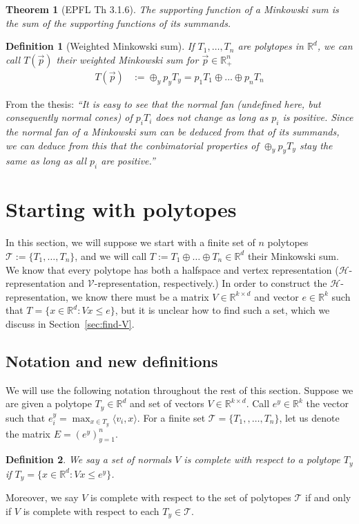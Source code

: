 \documentclass[12pt]{article}
\newcommand{\reals}{\mathbb{R}}
\renewcommand{\H}{\mathcal{H}}
\newcommand{\T}{\mathcal{T}}
\newcommand{\V}{\mathcal{V}}
\newcommand{\inprod}[2]{\langle #1, #2 \rangle}%
\newtheorem{theorem}{Theorem}
\newtheorem{definition}{Definition}
\begin{document}
\begin{theorem}[EPFL Th 3.1.6]\label{thm:support-minksum}
  The supporting function of a Minkowski sum is the sum of the supporting functions of its summands.
\end{theorem}

\begin{definition}[Weighted Minkowski sum]
  If $T_1, \ldots, T_n$ are polytopes in $\reals^d$, we can call $T(\vec p)$ their \emph{weighted} Minkowski sum for $\vec p \in \reals^n_+$
  \begin{align*}
    T(\vec p) &:= \oplus_y p_y T_y = p_1 T_1 \oplus \ldots \oplus p_n T_n
  \end{align*}
\end{definition}

  From the thesis:  \emph{``It is easy to see that the normal fan (undefined here, but consequently normal cones) of $p_i T_i$ does not change as long as $p_i$ is positive.  Since the normal fan of a Minkowski sum can be deduced from that of its summands, we can deduce from this that the conbimatorial properties of $\oplus_y p_y T_y$ stay the same as long as all $p_i$ are positive.''}

  \section{Starting with polytopes}\label{sec:start-polytope}
  In this section, we will suppose we start with a finite set of $n$ polytopes $\T := \{T_1, \ldots, T_n\}$, and we will call $T := T_1 \oplus \ldots \oplus T_n \in \reals^d$ their Minkowski sum.
  We know that every polytope has both a halfspace and vertex representation ($\H$-representation and $\V$-representation, respectively.)
  In order to construct the $\H$-representation, we know there must be a matrix $V \in \reals^{k \times d}$ and vector $e \in \reals^k$ such that $T = \{x \in \reals^d : Vx \leq e\}$, but it is unclear how to find such a set, which we discuss in Section~\ref{sec:find-V}.

  \subsection{Notation and new definitions}
  We will use the following notation throughout the rest of this section.
  Suppose we are given a polytope $T_y \in \reals^d$ and set of vectors $V \in \reals^{k \times d}$.
  Call $e^y \in \reals^k$ the vector such that $e^y_i = \max_{x \in T_y}\inprod{v_i}{x}$.  
  For a finite set $\T = \{T_1, , \ldots, T_n\}$, let us denote the matrix $E = (e^y)_{y=1}^n$.
  \begin{definition}
    We say a set of normals $V$ is \emph{complete} with respect to a polytope $T_y$ if $T_y = \{x \in \reals^d: Vx \leq e^y\}$.
  \end{definition}
  Moreover, we say $V$ is complete with respect to the set of polytopes $\T$ if and only if $V$ is complete with respect to each $T_y \in \T$.
\end{document}
